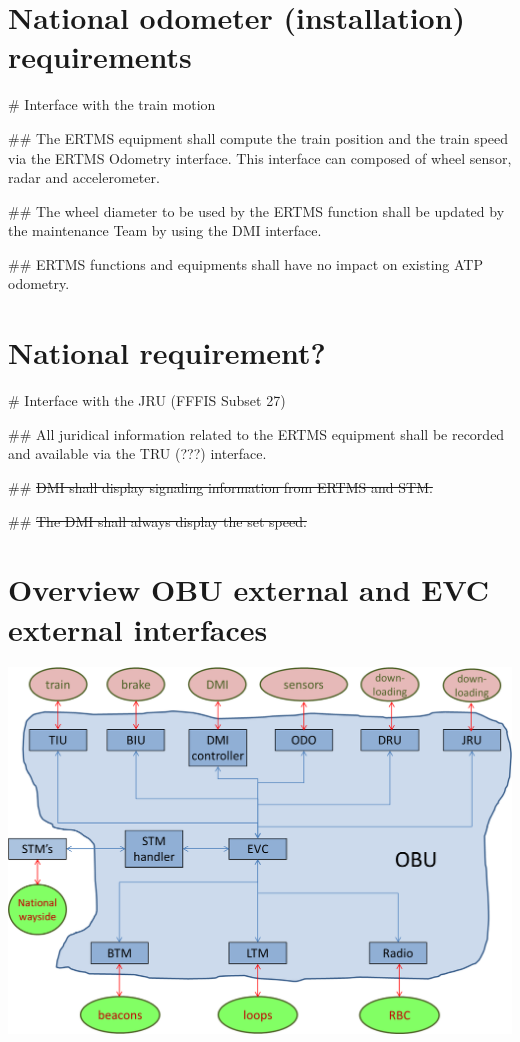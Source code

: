 \documentclass{template/openetcs_article}
\begin{document}
\section{National odometer (installation) requirements}

\begin{easylist}
# Interface with the train motion

## The ERTMS equipment shall compute the train position and the train speed via the ERTMS Odometry interface. This interface can composed of wheel sensor, radar and accelerometer.

## The wheel diameter to be used by the ERTMS function shall be updated by the maintenance Team by using the DMI interface.


## ERTMS functions and equipments shall have no impact on existing ATP odometry.
\end{easylist}


\section{National requirement?}

\begin{easylist}
# Interface with the JRU (FFFIS Subset 27)

## All juridical information related to the ERTMS equipment shall be recorded and available via the TRU (???) interface.

## \sout{ DMI shall display signaling information from ERTMS and STM.}

## \sout{The DMI shall always display the set speed.}
\end{easylist}

\section{Overview OBU external and EVC external interfaces}



\begin{center}
\includegraphics[scale=0.6]{figs/overview_obu}
\end{center}
\end{document}
